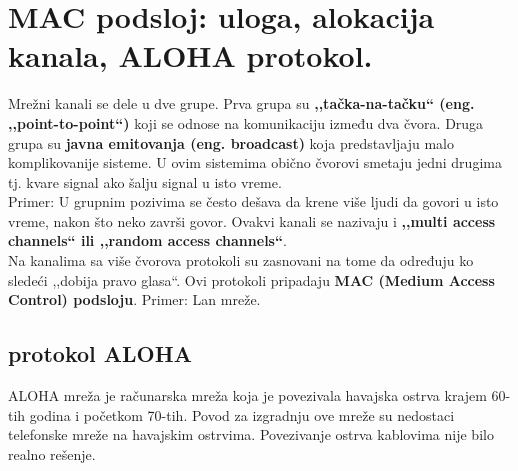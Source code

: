 \documentclass[a4paper]{article}
\begin{document}
\section{MAC podsloj: uloga, alokacija kanala, ALOHA protokol.}
    Mrežni kanali se dele u dve grupe. Prva grupa su \textbf{,,tačka-na-tačku`` (eng. ,,point-to-point``)}
    koji se odnose na komunikaciju između dva čvora. Druga grupa su \textbf{javna emitovanja (eng. broadcast)}
    koja predstavljaju malo komplikovanije sisteme. U ovim sistemima obično čvorovi smetaju jedni
    drugima tj. kvare signal ako šalju signal u isto vreme. \\
    \indent Primer: U grupnim pozivima se često
    dešava da krene više ljudi da govori u isto vreme, nakon što neko završi govor. 
    Ovakvi kanali se nazivaju i \textbf{,,multi access channels`` ili ,,random access channels``}. \\
    \indent Na kanalima sa više čvorova protokoli su zasnovani na tome da određuju ko sledeći
    ,,dobija pravo glasa``. Ovi protokoli pripadaju \textbf{MAC (Medium Access Control) podsloju}.
    Primer: Lan mreže. 
        
    \subsection{protokol ALOHA}
        ALOHA mreža je računarska mreža koja je povezivala havajska ostrva krajem 60-tih godina
        i početkom 70-tih. Povod za izgradnju ove mreže su nedostaci telefonske mreže na havajskim
        ostrvima. Povezivanje ostrva kablovima nije bilo realno rešenje. \\
        
\end{document}

